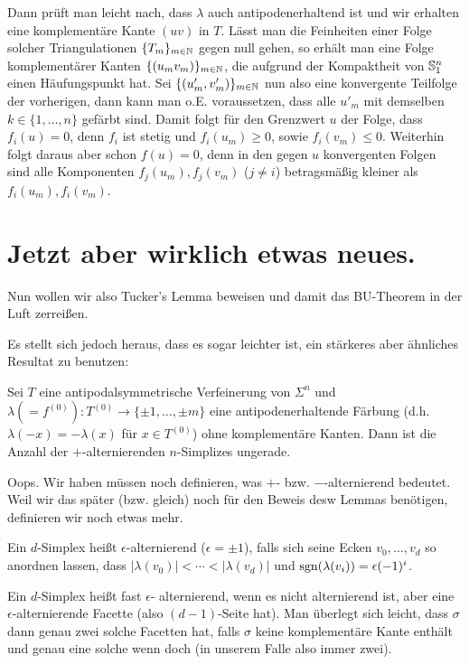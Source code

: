 \message{ !name(OnBorsukUlamsThoerem.tex)}\documentclass[10pt,a4paper]{article}
\begin{document}
Dann prüft man leicht nach, dass $\lambda$ auch antipodenerhaltend ist und wir erhalten eine komplementäre Kante $(uv)$ in $T$. Lässt man die Feinheiten einer Folge solcher Triangulationen $\{T_m\}_{m\in\mathbb{N}}$ gegen null gehen, so erhält man eine Folge komplementärer Kanten $\{(u_mv_m)\}_{m\in\mathbb{N}}$, die aufgrund der Kompaktheit von $\mathbb{S}^n_1$ einen Häufungspunkt hat. Sei $\{(u'_m,v'_m)\}_{m\in\mathbb{N}}$ nun also eine konvergente Teilfolge der vorherigen, dann kann man o.E. voraussetzen, dass alle $u'_m$ mit demselben $k\in\{1,\ldots,n\}$ gefärbt sind. Damit folgt für den Grenzwert $u$ der Folge, dass $f_i(u) = 0$, denn $f_i$ ist stetig und $f_i(u_m)\geq 0$, sowie $f_i(v_m)\leq 0$. Weiterhin folgt daraus aber schon $f(u)=0$, denn in den gegen $u$ konvergenten Folgen sind alle Komponenten $f_j(u_m),f_j(v_m)$ ($j\neq i$) betragsmäßig kleiner als $f_i(u_m),f_i(v_m)$.

\section{Jetzt aber wirklich etwas neues.}

Nun wollen wir also Tucker's Lemma beweisen und damit das BU-Theorem in der Luft zerreißen.

Es stellt sich jedoch heraus, dass es sogar leichter ist, ein stärkeres aber ähnliches Resultat zu benutzen:

\begin{lemma}[Ky Fan]
Sei $T$ eine antipodalsymmetrische Verfeinerung von $\Sigma^n$ und $\lambda(=f^{(0)}):T^{(0)}\to\{\pm1,\ldots,\pm m\}$ eine antipodenerhaltende Färbung (d.h. $\lambda(-x)=-\lambda(x)$ für $x\in T^{(0)}$) ohne komplementäre Kanten. Dann ist die Anzahl der $+$-alternierenden $n$-Simplizes ungerade. 
\end{lemma}

Oops. Wir haben müssen noch definieren, was $+$- bzw. $-$-alternierend bedeutet.
Weil wir das später (bzw. gleich) noch für den Beweis desw Lemmas benötigen, definieren wir noch etwas mehr.

\begin{definition}
Ein $d$-Simplex heißt $\epsilon$-alternierend ($\epsilon=\pm1$), falls sich seine Ecken $v_0,\ldots,v_d$ so anordnen lassen, dass $|\lambda(v_0)|<\cdots<|\lambda(v_d)|$ und $\operatorname{sgn}(\lambda(v_i))=\epsilon(-1)^i$. 

Ein $d$-Simplex heißt fast $\epsilon$- alternierend, wenn es nicht alternierend ist, aber eine $\epsilon$-alternierende Facette (also $(d-1)$-Seite hat). Man überlegt sich leicht, dass $\sigma$ dann genau zwei solche Facetten hat, falls $\sigma$ keine komplementäre Kante enthält und genau eine solche wenn doch (in unserem Falle also immer zwei).
\end{definition}
\end{document}
